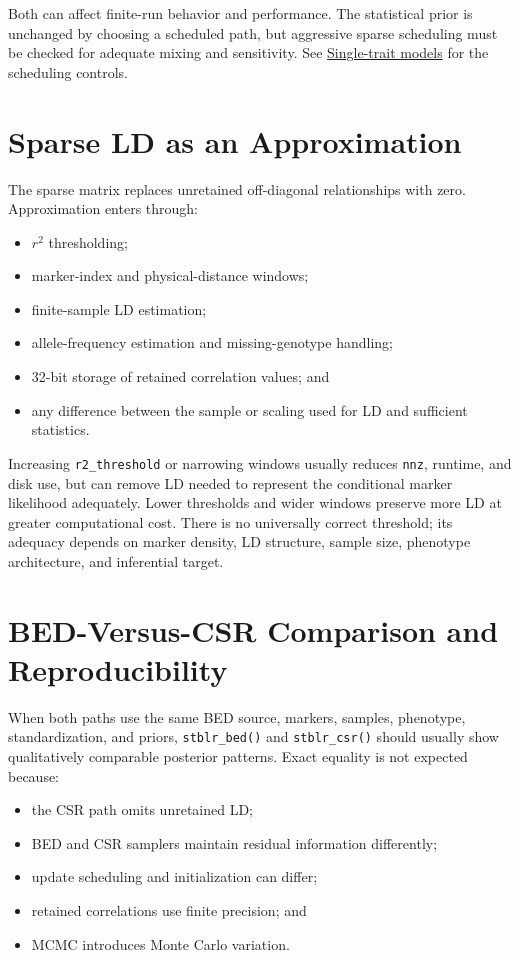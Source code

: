 \documentclass[
  11pt,
  letterpaper,
  DIV=11,
  numbers=noendperiod]{scrartcl}
\providecommand{\tightlist}{%
  \setlength{\itemsep}{0pt}\setlength{\parskip}{0pt}}
\begin{document}
Both can affect finite-run behavior and performance. The statistical
prior is unchanged by choosing a scheduled path, but aggressive sparse
scheduling must be checked for adequate mixing and sensitivity. See
\href{single_trait_models.html}{Single-trait models} for the scheduling
controls.

\section{Sparse LD as an
Approximation}\label{sparse-ld-as-an-approximation}

The sparse matrix replaces unretained off-diagonal relationships with
zero. Approximation enters through:

\begin{itemize}
\tightlist
\item
  \(r^2\) thresholding;
\item
  marker-index and physical-distance windows;
\item
  finite-sample LD estimation;
\item
  allele-frequency estimation and missing-genotype handling;
\item
  32-bit storage of retained correlation values; and
\item
  any difference between the sample or scaling used for LD and
  sufficient statistics.
\end{itemize}

Increasing \texttt{r2\_threshold} or narrowing windows usually reduces
\texttt{nnz}, runtime, and disk use, but can remove LD needed to
represent the conditional marker likelihood adequately. Lower thresholds
and wider windows preserve more LD at greater computational cost. There
is no universally correct threshold; its adequacy depends on marker
density, LD structure, sample size, phenotype architecture, and
inferential target.

\section{BED-Versus-CSR Comparison and
Reproducibility}\label{bed-versus-csr-comparison-and-reproducibility}

When both paths use the same BED source, markers, samples, phenotype,
standardization, and priors, \texttt{stblr\_bed()} and
\texttt{stblr\_csr()} should usually show qualitatively comparable
posterior patterns. Exact equality is not expected because:

\begin{itemize}
\tightlist
\item
  the CSR path omits unretained LD;
\item
  BED and CSR samplers maintain residual information differently;
\item
  update scheduling and initialization can differ;
\item
  retained correlations use finite precision; and
\item
  MCMC introduces Monte Carlo variation.
\end{itemize}
\end{document}
